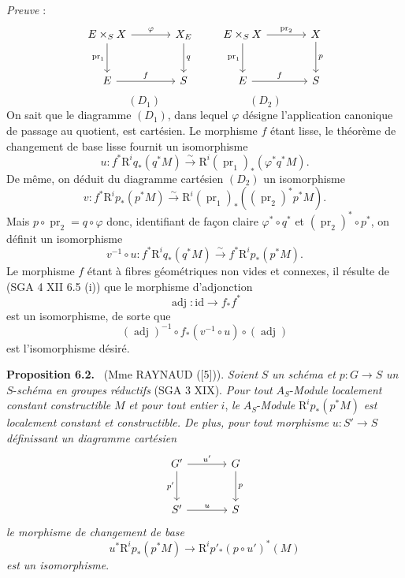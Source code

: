 \documentclass[11pt]{article}
\newenvironment{statement}[1]{\par\medskip\noindent\textbf{#1.}\ }{\par\medskip}
\providecommand{\pr}{\operatorname{pr}}
\providecommand{\pr}{\operatorname{pr}}
\begin{document}
\emph{Preuve} :
\[
\begin{tikzcd}[column sep=large,row sep=large]
E\times_S X \arrow[r,"\varphi"] \arrow[d,"\pr_1"'] & X_E \arrow[d,"q"]\\
E \arrow[r,"f"] & S
\end{tikzcd}
\qquad
\begin{tikzcd}[column sep=large,row sep=large]
E\times_S X \arrow[r,"\pr_2"] \arrow[d,"\pr_1"'] & X \arrow[d,"p"]\\
E \arrow[r,"f"] & S
\end{tikzcd}
\]
\[
(D_1)\qquad\qquad\qquad\qquad(D_2)
\]
On sait que le diagramme $(D_1)$, dans lequel $\varphi$ désigne l'application canonique de passage au quotient, est cartésien. Le morphisme $f$ étant lisse, le théorème de changement de base lisse fournit un isomorphisme
\[
u:f^*\mathrm{R}^iq_*(q^*M)\xrightarrow{\sim}\mathrm{R}^i(\pr_1)_*(\varphi^*q^*M).
\]
De même, on déduit du diagramme cartésien $(D_2)$ un isomorphisme
\[
v:f^*\mathrm{R}^ip_*(p^*M)\xrightarrow{\sim}\mathrm{R}^i(\pr_1)_*((\pr_2)^*p^*M).
\]
Mais $p\circ\pr_2=q\circ\varphi$ donc, identifiant de façon claire $\varphi^*\circ q^*$ et $(\pr_2)^*\circ p^*$, on définit un isomorphisme
\[
v^{-1}\circ u:f^*\mathrm{R}^iq_*(q^*M)\xrightarrow{\sim} f^*\mathrm{R}^ip_*(p^*M).
\]
Le morphisme $f$ étant à fibres géométriques non vides et connexes, il
résulte de 
(SGA 4 XII 6.5 (i)) que le morphisme d'adjonction
\[
\operatorname{adj}:\mathrm{id}\to f_*f^*
\]
est un isomorphisme, de sorte que
\[
(\operatorname{adj})^{-1}\circ f_*(v^{-1}\circ u)\circ(\operatorname{adj})
\]
est l'isomorphisme désiré.

\begin{statement}{Proposition 6.2}
(Mme RAYNAUD ([5])). \emph{Soient} $S$ \emph{un schéma et} $p:G\to S$ \emph{un} $S$-\emph{schéma en groupes réductifs} (SGA 3 XIX). \emph{Pour tout} $A_S$-\emph{Module localement constant constructible} $M$ \emph{et pour tout entier} $i$, \emph{le} $A_S$-\emph{Module} $\mathrm{R}^ip_*(p^*M)$ \emph{est localement constant et constructible. De plus, pour tout morphisme} $u:S'\to S$ \emph{définissant un diagramme cartésien}
\[
\begin{tikzcd}[column sep=large,row sep=large]
G' \arrow[r,"u'"] \arrow[d,"p'"'] & G \arrow[d,"p"]\\
S' \arrow[r,"u"] & S
\end{tikzcd}
\]
\emph{le morphisme de changement de base}
\[
u^*\mathrm{R}^ip_*(p^*M)\to \mathrm{R}^ip'_*(p\circ u')^*(M)
\]
\emph{est un isomorphisme}.
\end{statement}
\end{document}
